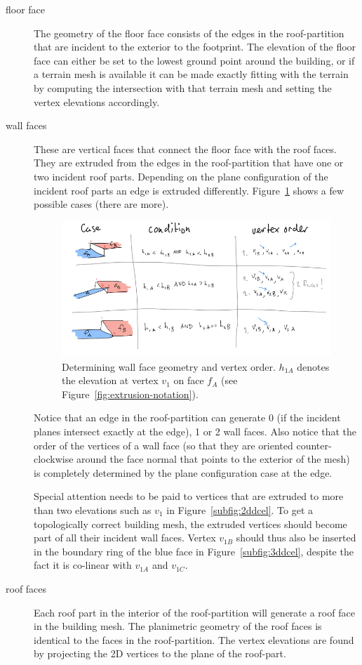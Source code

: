 \begin{description}
\item[floor face] The geometry of the floor face consists of the edges in the roof-partition that are incident to the exterior to the footprint. The elevation of the floor face can either be set to the lowest ground point around the building, or if a terrain mesh is available it can be made exactly fitting with the terrain by computing the intersection with that terrain mesh and setting the vertex elevations accordingly. 

\item[wall faces] These are vertical faces that connect the floor face with the roof faces. They are extruded from the edges in the roof-partition that have one or two incident roof parts. Depending on the plane configuration of the incident roof parts an edge is extruded differently. Figure~\ref{fig:extrusion-cases} shows a few possible cases (there are more).
\begin{figure}
	\includegraphics[width=\linewidth]{figs/extrusion-edge-cases.pdf}
	\caption{Determining wall face geometry and vertex order. $h_{1A}$ denotes the elevation at vertex $v_1$ on face $f_A$ (see Figure~\ref{fig:extrusion-notation}).}%
	\label{fig:extrusion-cases}
\end{figure}
Notice that an edge in the roof-partition can generate 0 (if the incident planes intersect exactly at the edge), 1 or 2 wall faces.
Also notice that the order of the vertices of a wall face (so that they are oriented counter-clockwise around the face normal that points to the exterior of the mesh) is completely determined by the plane configuration case at the edge.

Special attention needs to be paid to vertices that are extruded to more than two elevations such as $v_1$ in Figure~\ref{subfig:2ddcel}.
To get a topologically correct building mesh, the extruded vertices should become part of all their incident wall faces.
Vertex $v_{1B}$ should thus also be inserted in the boundary ring of the blue face in Figure~\ref{subfig:3ddcel}, despite the fact it is co-linear with $v_{1A}$ and $v_{1C}$.

\item[roof faces]  Each roof part in the interior of the roof-partition will generate a roof face in the building mesh. The planimetric geometry of the roof faces is identical to the faces in the roof-partition. The vertex elevations are found by projecting the 2D vertices to the plane of the roof-part.
\end{description}

